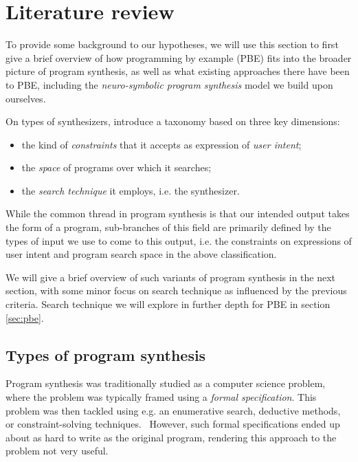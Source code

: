 \documentclass{article}
\begin{document}

\section{Literature review} \label{sec:litreview}

To provide some background to our hypotheses,
we will use this section to first give a brief overview of how programming by example (PBE) fits into the broader picture of program synthesis,
as well as what existing approaches there have been to PBE,
including the \emph{neuro-symbolic program synthesis} model we build upon ourselves.

On types of synthesizers,
\citet{gulwani2017program} introduce a taxonomy based on three key dimensions:
\begin{itemize}
    \item the kind of \emph{constraints} that it accepts as expression of \emph{user intent};
    \item the \emph{space} of programs over which it searches;
    \item the \emph{search technique} it employs, i.e. the synthesizer.
\end{itemize}

While the common thread in program synthesis is that our intended output takes the form of a program,
sub-branches of this field are primarily defined by the types of input we use to come to this output,
i.e. the constraints on expressions of user intent and program search space in the above classification.

We will give a brief overview of such variants of program synthesis in the next section,
with some minor focus on search technique as influenced by the previous criteria.
Search technique we will explore in further depth for PBE in section \ref{sec:pbe}.

\subsection{Types of program synthesis} \label{sec:synthtypes}


Program synthesis was traditionally studied as a computer science problem,
where the problem was typically framed using a \emph{formal specification}.
This problem was then tackled using e.g. an enumerative search, deductive methods, or constraint-solving techniques.~\citep{gulwani2017program}
However, such formal specifications ended up about as hard to write as the original program,
rendering this approach to the problem not very useful.
\end{document}

